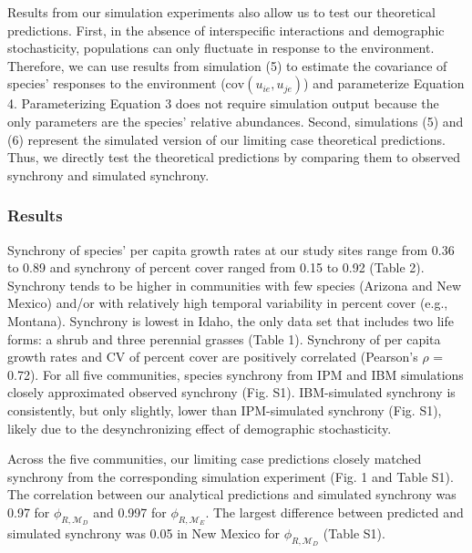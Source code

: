 \documentclass[12pt,]{article}
\begin{document}
Results from our simulation experiments also allow us to test our
theoretical predictions. First, in the absence of interspecific
interactions and demographic stochasticity, populations can only
fluctuate in response to the environment. Therefore, we can use results
from simulation (5) to estimate the covariance of species' responses to
the environment (\(\text{cov}(u_{ie}, u_{je})\)) and parameterize
Equation 4. Parameterizing Equation 3 does not require simulation output
because the only parameters are the species' relative abundances.
Second, simulations (5) and (6) represent the simulated version of our
limiting case theoretical predictions. Thus, we directly test the
theoretical predictions by comparing them to observed synchrony and
simulated synchrony.

\subsubsection{Results}\label{results}

Synchrony of species' per capita growth rates at our study sites range
from 0.36 to 0.89 and synchrony of percent cover ranged from 0.15 to
0.92 (Table 2). Synchrony tends to be higher in communities with few
species (Arizona and New Mexico) and/or with relatively high temporal
variability in percent cover (e.g., Montana). Synchrony is lowest in
Idaho, the only data set that includes two life forms: a shrub and three
perennial grasses (Table 1). Synchrony of per capita growth rates and CV
of percent cover are positively correlated (Pearson's \(\rho\) = 0.72).
For all five communities, species synchrony from IPM and IBM simulations
closely approximated observed synchrony (Fig. S1). IBM-simulated
synchrony is consistently, but only slightly, lower than IPM-simulated
synchrony (Fig. S1), likely due to the desynchronizing effect of
demographic stochasticity.

Across the five communities, our limiting case predictions closely
matched synchrony from the corresponding simulation experiment (Fig. 1
and Table S1). The correlation between our analytical predictions and
simulated synchrony was 0.97 for \(\phi_{R,\mathcal{M}_D}\) and 0.997
for \(\phi_{R,\mathcal{M}_E}\). The largest difference between predicted
and simulated synchrony was 0.05 in New Mexico for
\(\phi_{R,\mathcal{M}_D}\) (Table S1).
\end{document}
